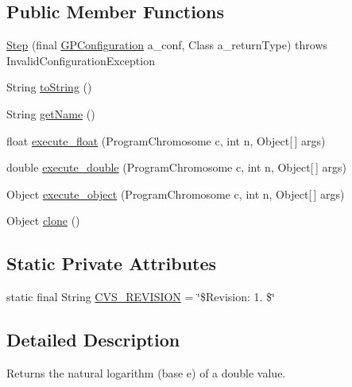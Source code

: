 \subsection*{Public Member Functions}
\begin{DoxyCompactItemize}
\item 
\hyperlink{classexamples_1_1gp_1_1symbolic_regression_1_1_step_a30f9d4632901b7a5aa952dad7a94150f}{Step} (final \hyperlink{classorg_1_1jgap_1_1gp_1_1impl_1_1_g_p_configuration}{G\-P\-Configuration} a\-\_\-conf, Class a\-\_\-return\-Type)  throws Invalid\-Configuration\-Exception 
\item 
String \hyperlink{classexamples_1_1gp_1_1symbolic_regression_1_1_step_a364eb64b3f23fb1984883d8ed02395c8}{to\-String} ()
\item 
String \hyperlink{classexamples_1_1gp_1_1symbolic_regression_1_1_step_a05beb929058339dee7021386bae7dd47}{get\-Name} ()
\item 
float \hyperlink{classexamples_1_1gp_1_1symbolic_regression_1_1_step_a9d9ef71f5f3c8b2708065a15e95eb7af}{execute\-\_\-float} (Program\-Chromosome c, int n, Object\mbox{[}$\,$\mbox{]} args)
\item 
double \hyperlink{classexamples_1_1gp_1_1symbolic_regression_1_1_step_a3c0dcb147d1581787421e999cd2cc08d}{execute\-\_\-double} (Program\-Chromosome c, int n, Object\mbox{[}$\,$\mbox{]} args)
\item 
Object \hyperlink{classexamples_1_1gp_1_1symbolic_regression_1_1_step_a5769d51754b777c7eacce09e5ab2b9d4}{execute\-\_\-object} (Program\-Chromosome c, int n, Object\mbox{[}$\,$\mbox{]} args)
\item 
Object \hyperlink{classexamples_1_1gp_1_1symbolic_regression_1_1_step_a850ca6bdda82a08d712fb21f288009e7}{clone} ()
\end{DoxyCompactItemize}
\subsection*{Static Private Attributes}
\begin{DoxyCompactItemize}
\item 
static final String \hyperlink{classexamples_1_1gp_1_1symbolic_regression_1_1_step_ad7ba20d56408811914c460566b21ed76}{C\-V\-S\-\_\-\-R\-E\-V\-I\-S\-I\-O\-N} = \char`\"{}\$Revision\-: 1. \$\char`\"{}
\end{DoxyCompactItemize}


\subsection{Detailed Description}
Returns the natural logarithm (base e) of a double value.

